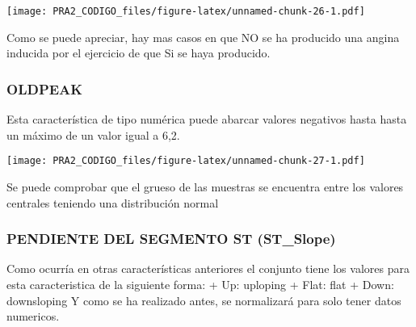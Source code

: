 \documentclass[
]{article}
\newenvironment{Shaded}{\begin{snugshade}}{\end{snugshade}}
\newcommand{\AttributeTok}[1]{\textcolor[rgb]{0.80,0.80,0.80}{#1}}
\newcommand{\DecValTok}[1]{\textcolor[rgb]{0.86,0.86,0.80}{#1}}
\newcommand{\FloatTok}[1]{\textcolor[rgb]{0.75,0.75,0.82}{#1}}
\newcommand{\FunctionTok}[1]{\textcolor[rgb]{0.94,0.94,0.56}{#1}}
\newcommand{\NormalTok}[1]{\textcolor[rgb]{0.80,0.80,0.80}{#1}}
\newcommand{\OtherTok}[1]{\textcolor[rgb]{0.94,0.94,0.56}{#1}}
\newcommand{\SpecialCharTok}[1]{\textcolor[rgb]{0.86,0.64,0.64}{#1}}
\newcommand{\StringTok}[1]{\textcolor[rgb]{0.80,0.58,0.58}{#1}}
\begin{document}
\texttt{[image: PRA2\_CODIGO\_files/figure-latex/unnamed-chunk-26-1.pdf]}

Como se puede apreciar, hay mas casos en que NO se ha producido una
angina inducida por el ejercicio de que Si se haya producido.

\hypertarget{oldpeak}{%
\subsubsection{OLDPEAK}\label{oldpeak}}

Esta característica de tipo numérica puede abarcar valores negativos
hasta hasta un máximo de un valor igual a 6,2.

\begin{Shaded}
\end{Shaded}

\texttt{[image: PRA2\_CODIGO\_files/figure-latex/unnamed-chunk-27-1.pdf]}

Se puede comprobar que el grueso de las muestras se encuentra entre los
valores centrales teniendo una distribución normal

\hypertarget{pendiente-del-segmento-st-st_slope}{%
\subsubsection{PENDIENTE DEL SEGMENTO ST
(ST\_Slope)}\label{pendiente-del-segmento-st-st_slope}}

Como ocurría en otras características anteriores el conjunto tiene los
valores para esta caracteristica de la siguiente forma: + Up: uploping +
Flat: flat + Down: downsloping Y como se ha realizado antes, se
normalizará para solo tener datos numericos.
\end{document}
